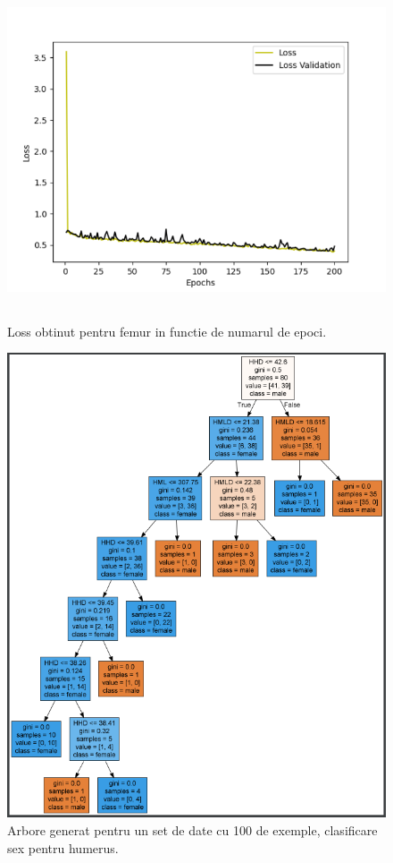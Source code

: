 \documentclass[runningheads,a4paper,11pt]{report}
\begin{document}
\begin{figure}[h!]
\centerline{\includegraphics[height=10cm]{Imagini/loss_femur.png}}
\caption{Loss obtinut pentru femur in functie de numarul de epoci.}
\label{fig}
\end{figure}

\begin{figure}
\centerline{\includegraphics{Imagini/tree_sex_humerus_100.PNG}}
\caption{Arbore generat pentru un set de date cu 100 de exemple, clasificare sex pentru humerus.}
\label{fig}
\end{figure}
\end{document}
